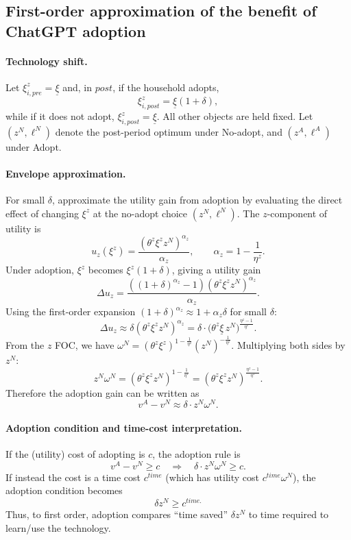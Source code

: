 \documentclass[12pt]{article}
\begin{document}
\subsection{First-order approximation of the benefit of ChatGPT adoption} \label{app:adoption}

\paragraph{Technology shift.}
Let $\xi_{i,pre}^z=\underline{\xi}$ and, in $post$, if the household adopts,
\[
\xi_{i,post}^z=\underline{\xi}(1+\delta),
\]
while if it does not adopt, $\xi_{i,post}^z=\underline{\xi}$. All other objects are held fixed. Let $(z^N,\ell^N)$ denote the post-period optimum under No-adopt, and $(z^A,\ell^A)$ under Adopt.

\paragraph{Envelope approximation.}
For small $\delta$, approximate the utility gain from adoption by evaluating the direct effect of changing $\xi^z$ at the no-adopt choice $(z^N,\ell^N)$. The $z$-component of utility is
\[
u_z(\xi^z)=\frac{(\theta^z\xi^z z^N)^{\alpha_z}}{\alpha_z},
\qquad \alpha_z=1-\frac{1}{\eta^z}.
\]
Under adoption, $\xi^z$ becomes $\xi^z(1+\delta)$, giving a utility gain
\[
\Delta u_z
=
\frac{\left((1+\delta)^{\alpha_z}-1\right)(\theta^z\xi^z z^N)^{\alpha_z}}{\alpha_z}.
\]
Using the first-order expansion $(1+\delta)^{\alpha_z}\approx 1+\alpha_z\delta$ for small $\delta$:
\[
\Delta u_z
\approx \delta(\theta^z\xi^z z^N)^{\alpha_z}
=\delta\cdot\Big(\theta^z\underline{\xi}\,z^N\Big)^{\frac{\eta^z-1}{\eta^z}}.
\]
From the $z$ FOC, we have $\omega^N=(\theta^z\xi^z)^{1-\frac{1}{\eta^z}}(z^N)^{-\frac{1}{\eta^z}}$. Multiplying both sides by $z^N$:
\[
z^N\omega^N
=(\theta^z\xi^z z^N)^{1-\frac{1}{\eta^z}}
=(\theta^z\xi^z z^N)^{\frac{\eta^z-1}{\eta^z}}.
\]
Therefore the adoption gain can be written as
\begin{equation}
\label{eq:app_gain}
v^A-v^N \approx \delta\cdot z^N\omega^N.
\end{equation}

\paragraph{Adoption condition and time-cost interpretation.}
If the (utility) cost of adopting is $c$, the adoption rule is
\[
v^A-v^N\ge c
\quad\Rightarrow\quad
\delta\cdot z^N\omega^N \ge c.
\]
If instead the cost is a time cost $c^{time}$ (which has utility cost $c^{time}\omega^N$), the adoption condition becomes
\[
\delta z^N \ge c^{time.}
\]
Thus, to first order, adoption compares ``time saved'' $\delta z^N$ to time required to learn/use the technology.
\end{document}
